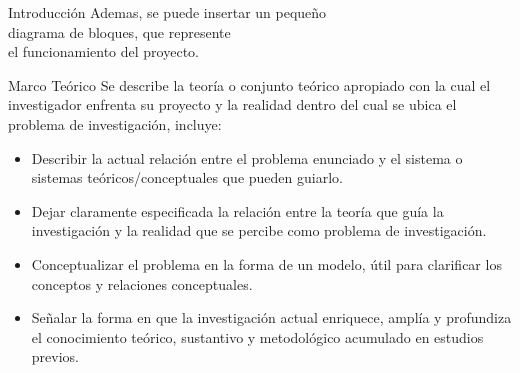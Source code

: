 \documentclass{beamer}
\begin{document}
\begin{darkframes}
\begin{frame}{Introducción}
      \bigskip
      Ademas, se puede insertar un pequeño\\
      diagrama de bloques, que represente\\
      el funcionamiento del proyecto.\\
    \end{frame}
    \begin{frame}{Marco Teórico}
      \justifying
      Se describe la teoría o conjunto teórico apropiado con la cual el investigador enfrenta su proyecto y la realidad
      dentro del cual se ubica el problema de investigación, incluye:
      \begin{itemize}
          \item Describir la actual relación entre el problema enunciado y el sistema o sistemas teóricos/conceptuales
          que pueden guiarlo.
          \item Dejar claramente especificada la relación entre la teoría que guía la investigación y la realidad que se
          percibe como problema de investigación. 
          \item Conceptualizar el problema en la forma de un modelo, útil para clarificar los conceptos y relaciones
          conceptuales.
          \item Señalar la forma en que la investigación actual enriquece, amplía y profundiza el conocimiento teórico,
          sustantivo y metodológico acumulado en estudios previos.
      \end{itemize}
    \end{frame}


\end{darkframes}
\end{document}
